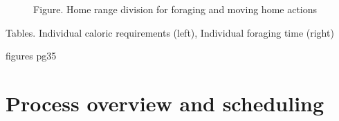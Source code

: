 \documentclass[11pt,oneside,a4paper,openright]{report}
\begin{document}

 




\begin{figure}[h]
\centering
\setlength\fboxsep{0pt}
\setlength\fboxrule{0.5pt}
\caption{Figure. Home range division for foraging and moving home actions}
\label{fig:sectorsDivision}
\end{figure}


Tables. Individual caloric requirements (left), Individual foraging time (right)

figures pg35 


\section{Process overview and scheduling}
\end{document}
